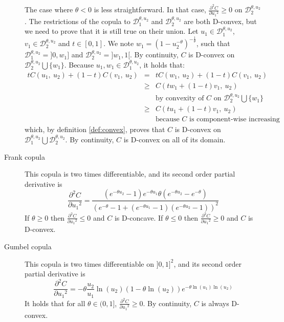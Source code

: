 \begin{description}
The case where $\theta<0$ is less straightforward. In that case, $\frac{\partial^2 C}{\partial {u_1}^2}\geqslant0$ on $\mathcal{D}_2^{\theta,u_2}$. The restrictions of the copula to $\mathcal{D}_1^{\theta,u_2}$ and $\mathcal{D}_2^{\theta,u_2}$ are both D-convex, but we need to prove that it is still true on their union. Let $u_1\in\mathcal{D}_1^{\theta,u_2}$, $v_1\in\mathcal{D}_2^{\theta,u_2}$ and $t\in[0,1]$. We note $w_1=(1-u_2^{-\theta})^{-\frac{1}{\theta}}$, such that $\mathcal{D}_1^{\theta,u_2}=]0,w_1]$ and $\mathcal{D}_2^{\theta,u_2}=]w_1, 1[$. By continuity, $C$ is D-convex on $\mathcal{D}_2^{\theta,u_2}\bigcup\{w_1\}$. Because $u_1,w_1\in \mathcal{D}_1^{\theta,u_2}$, it holds that:
    \begin{eqnarray*}
        tC(u_1,~u_2)+(1-t)C(v_1,~u_2) &=& tC(w_1,~u_2)+(1-t)C(v_1,~u_2)\\
        &\geqslant& C(tw_1+(1-t)v_1,~u_2)\\
        &&\text{by convexity of $C$ on $\mathcal{D}_2^{\theta,u_2}\bigcup\{w_1\}$}\\
        &\geqslant& C(tu_1+(1-t)v_1,~u_2)\\
        && \text{because $C$ is component-wise increasing}
    \end{eqnarray*}
which, by definition \ref{def:convex}, proves that $C$ is D-convex on $\mathcal{D}_1^{\theta,u_2}\bigcup \mathcal{D}_2^{\theta,u_2}$. By continuity, $C$ is D-convex on all of its domain.
\item[Frank copula] This copula is two times differentiable, and its second order partial derivative is
$$\frac{\partial^2 C}{\partial {u_1}^2}=\frac{(e^{-\theta u_2}-1)e^{-\theta u_1}\theta(e^{-\theta u_2}-e^{-\theta} )}{(e^{-\theta}-1+(e^{-\theta u_1}-1)(e^{-\theta u_2}-1))^2}$$
If $\theta\geqslant0$ then $\frac{\partial^2 C}{\partial {u_1}^2}\leqslant 0$ and $C$ is D-concave. If $\theta\leqslant0$ then $\frac{\partial^2 C}{\partial {u_1}^2}\geqslant 0$ and $C$ is D-convex.
\item[Gumbel copula] This copula is two times differentiable on $]0,1]^2$, and its second order partial derivative is
$$\frac{\partial^2 C}{\partial {u_1}^2}=-\theta\frac{u_2}{u_1}\ln(u_2)(1-\theta\ln(u_2))e^{-\theta\ln(u_1)\ln(u_2)}$$
It holds that for all $\theta\in(0,1]$, $\frac{\partial^2 C}{\partial {u_1}^2}\geqslant0$. By continuity, $C$ is always D-convex.
\end{description}

